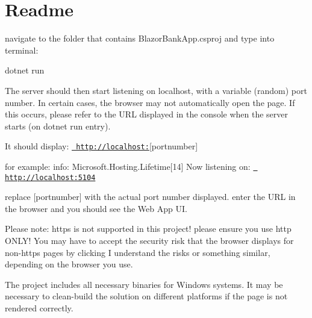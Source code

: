 \chapter{Readme}
\hypertarget{md__readme}{}\label{md__readme}
navigate to the folder that contains Blazor\+Bank\+App.\+csproj and type into terminal\+:

dotnet run

The server should then start listening on localhost, with a variable (random) port number. In certain cases, the browser may not automatically open the page. If this occurs, please refer to the URL displayed in the console when the server starts (on dotnet run entry).

It should display\+: \href{http://localhost:}{\texttt{ http\+://localhost\+:}}\mbox{[}portnumber\mbox{]}

for example\+: info\+: Microsoft.\+Hosting.\+Lifetime\mbox{[}14\mbox{]} Now listening on\+: \href{http://localhost:5104}{\texttt{ http\+://localhost\+:5104}}

replace \mbox{[}portnumber\mbox{]} with the actual port number displayed. enter the URL in the browser and you should see the Web App UI.

Please note\+: https is not supported in this project! please ensure you use http ONLY! You may have to accept the \textquotesingle{}security risk\textquotesingle{} that the browser displays for non-\/https pages by clicking \textquotesingle{}I understand the risks\textquotesingle{} or something similar, depending on the browser you use.

The project includes all necessary binaries for Windows systems. It may be necessary to clean-\/build the solution on different platforms if the page is not rendered correctly. 